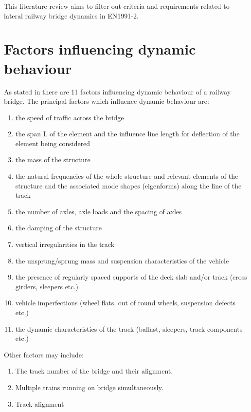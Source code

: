 \begin{appendices}
This literature review aims to filter out criteria and requirements related to lateral railway bridge dynamics in EN1991-2.


\section{Factors influencing dynamic behaviour}
As stated in\citet[6.4.2]{EC12} there are 11 factors influencing dynamic behaviour of a railway bridge. The principal factors which influence dynamic behaviour are:
\begin{enumerate}[-]
	\item the speed of traffic across the bridge
	\item the span L of the element and the influence line length for deflection of the element being considered
	\item the mass of the structure
	\item the natural frequencies of the whole structure and relevant elements of the structure and the associated mode shapes (eigenforms) along the line of the track
	\item the number of axles, axle loads and the spacing of axles
	\item the damping of the structure
	\item vertical irregularities in the track
	\item the unsprung/sprung mass and suspension characteristics of the vehicle
	\item the presence of regularly spaced supports of the deck slab and/or track (cross girders, sleepers etc.)
	\item vehicle imperfections (wheel flats, out of round wheels, suspension defects etc.)
	\item the dynamic characteristics of the track (ballast, sleepers, track components etc.)
\end{enumerate}

\vspace*{0.2cm}

Other factors may include:

\begin{enumerate}

	\item The track number of the bridge and their alignment. 
	\item Multiple trains running on bridge simultaneously. 
	\item Track alignment

\end{enumerate}


\end{appendices}
